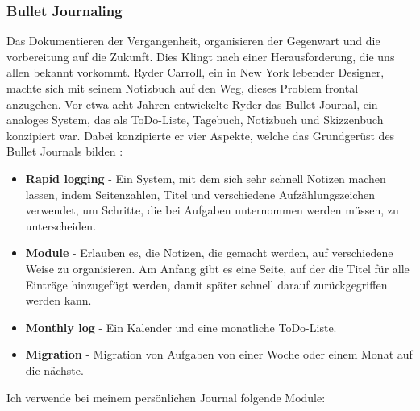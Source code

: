 \subsubsection{Bullet Journaling}
\label{bulletjournaling}
Das Dokumentieren der Vergangenheit, organisieren der Gegenwart und die vorbereitung auf die Zukunft.
\newline
Dies Klingt nach einer Herausforderung, die uns allen bekannt vorkommt.
\newline
Ryder Carroll, ein in New York lebender Designer, machte sich mit seinem Notizbuch auf den Weg, dieses Problem frontal anzugehen. Vor etwa acht Jahren entwickelte Ryder das Bullet Journal, ein analoges System, das als ToDo-Liste, Tagebuch, Notizbuch und Skizzenbuch konzipiert war. Dabei konzipierte er vier Aspekte, welche das Grundgerüst des Bullet Journals bilden \cite{bulletjournal_2020} :
\begin{itemize}
  \item \textbf{Rapid logging} - Ein System, mit dem sich sehr schnell Notizen machen lassen, indem Seitenzahlen, Titel und verschiedene Aufzählungszeichen verwendet, um Schritte, die bei Aufgaben unternommen werden müssen, zu unterscheiden.
  \item \textbf{Module} - Erlauben es, die Notizen, die gemacht werden, auf verschiedene Weise zu organisieren. Am Anfang gibt es eine Seite, auf der die Titel für alle Einträge hinzugefügt werden, damit später schnell darauf zurückgegriffen werden kann.
  \item \textbf{Monthly log} - Ein Kalender und eine monatliche ToDo-Liste.
  \item \textbf{Migration} - Migration von Aufgaben von einer Woche oder einem Monat auf die nächste.
\end{itemize}
Ich verwende bei meinem persönlichen Journal folgende Module:
